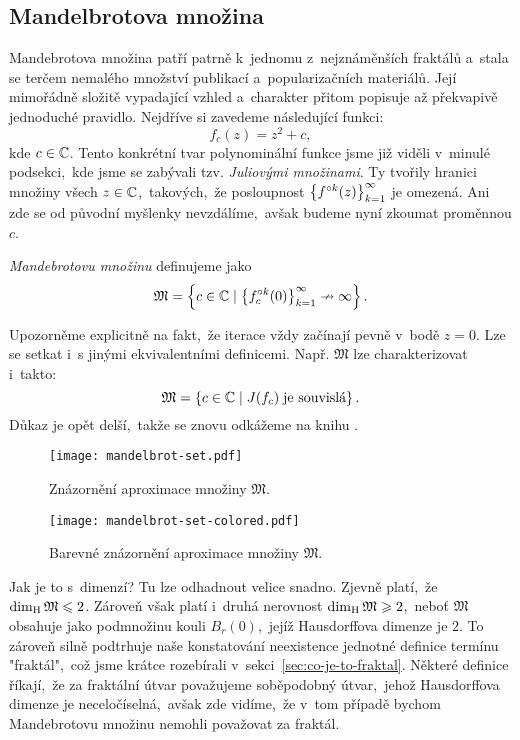\subsection{Mandelbrotova množina}\label{subsec:mandebrotova-mnozina}

Mandebrotova množina patří patrně k~jednomu z~nejznáměnších fraktálů a~stala se terčem nemalého množství publikací a~popularizačních materiálů. Její mimořádně složitě vypadající vzhled a~charakter přitom popisuje až překvapivě jednoduché pravidlo. Nejdříve si zavedeme následující funkci:
\[f_c(z)=z^2+c,\]
kde $c\in\mathbb{C}$. Tento konkrétní tvar polynominální funkce jsme již viděli v~minulé podsekci,~kde jsme se zabývali tzv. \emph{Juliovými množinami}. Ty tvořily hranici množiny všech $z\in\mathbb{C}$,~takových,~že posloupnost $\left\{f^{\circ k}(z)\right\}_{k=1}^\infty$ je omezená. Ani zde se od původní myšlenky nevzdálíme,~avšak budeme nyní zkoumat proměnnou $c$.
\begin{definition}\label{def:mandebrotova-mnozina}
    \emph{Mandebrotovu množinu} definujeme jako
    \[\mathfrak{M}=\left\{c\in\mathbb{C}\mid \left\{f_c^{\circ k}(0)\right\}_{k=1}^\infty\nrightarrow\infty\right\}.\]
\end{definition}
Upozorněme explicitně na fakt,~že iterace vždy začínají pevně v~bodě $z=0$. Lze se setkat i~s jinými ekvivalentními definicemi. Např. $\mathfrak{M}$ lze charakterizovat i~takto:
\[\mathfrak{M}=\left\{c\in\mathbb{C}\mid J(f_c)\;\text{je souvislá}\right\}.\]
Důkaz je opět delší,~takže se znovu odkážeme na knihu \citep[str. 245]{Falconer1989}.
\begin{figure}[h]
    \centering
    \texttt{[image: mandelbrot-set.pdf]}
    \caption{Znázornění aproximace množiny $\mathfrak{M}$.}
    \label{fig:znazorneni-mandebrotovy-mnoziny}
\end{figure}
\begin{figure}[h]
    \centering
    \texttt{[image: mandelbrot-set-colored.pdf]}
    \caption{Barevné znázornění aproximace množiny $\mathfrak{M}$.}
    \label{fig:znazorneni-mandebrotovy-mnoziny-vybarveno}
\end{figure}
Jak je to s~dimenzí? Tu lze odhadnout velice snadno. Zjevně platí,~že $\operatorname{dim_H}{\mathfrak{M}}\leqslant 2$. Zároveň však platí i~druhá nerovnost $\operatorname{dim_H}{\mathfrak{M}}\geqslant 2$,~neboť $\mathfrak{M}$ obsahuje jako podmnožinu kouli $B_r(0)$,~jejíž Hausdorffova dimenze je $2$. To zároveň silně podtrhuje naše konstatování neexistence jednotné definice termínu "fraktál",~což jsme krátce rozebírali v~sekci~\ref{sec:co-je-to-fraktal}. Některé definice říkají,~že za fraktální útvar považujeme soběpodobný útvar,~jehož Hausdorffova dimenze je neceločíselná,~avšak zde vidíme,~že v~tom případě bychom Mandebrotovu množinu nemohli považovat za fraktál.